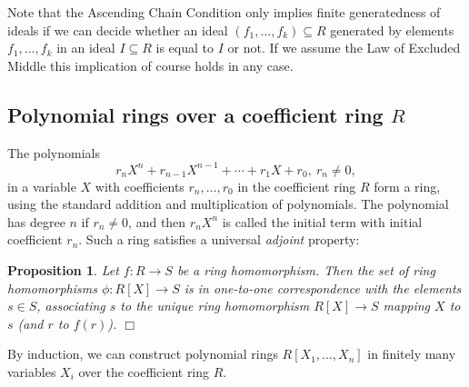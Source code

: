 \documentclass{amsart}
\theoremstyle{plain}
\numberwithin{equation}{section} %
\numberwithin{figure}{section} %
\theoremstyle{plain}
\theoremstyle{plain}
\theoremstyle{plain}
\theoremstyle{plain}
\theoremstyle{plain}
\newtheorem{prop}[thm]{Proposition} %
\theoremstyle{plain}
\theoremstyle{remark}
\theoremstyle{remark}
\theoremstyle{remark}
\begin{document}
Note that the Ascending Chain Condition only implies finite generatedness of ideals if we can decide whether an ideal $(f_1, \ldots, f_k) \subseteq R$ generated by elements $f_1, \ldots, f_k$ in an ideal $I \subseteq R$ is equal to $I$ or not. If we assume the Law of Excluded Middle this implication of course holds in any case.

\subsection{Polynomial rings over a coefficient ring $R$}

The polynomials 
\[ r_nX^n + r_{n-1}X^{n-1} + \cdots + r_1X + r_0,\ r_n \neq 0, \] 
in a variable $X$ with coefficients $r_n, \ldots, r_0$ in the coefficient ring $R$ form a ring, using the standard addition and multiplication of polynomials. The polynomial has degree $n$ if $r_n \neq 0$, and then $r_nX^n$ is called the initial term with initial coefficient $r_n$. Such a ring satisfies a universal \textit{adjoint} property:
\begin{prop}
Let $f: R \rightarrow S$ be a ring homomorphism. Then the set of ring homomorphisms $\phi: R[X] \rightarrow S$ is in one-to-one correspondence with the elements $s \in S$, associating $s$ to the unique ring homomorphism $R[X] \rightarrow S$ mapping $X$ to $s$ (and $r$ to $f(r)$). \hfill $\Box$
\end{prop}

By induction, we can construct polynomial rings $R[X_1, \ldots, X_n]$ in finitely many variables $X_i$ over the coefficient ring $R$. 
\end{document}
